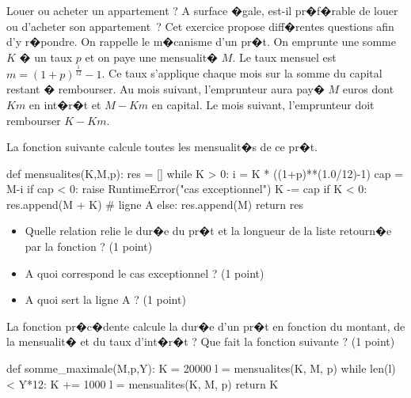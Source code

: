 %

\firstpassagedo{
\newcommand{\sametextforthisinterro}[0]{ 
\huge Formation pour l'Actuaire Data Scientist, TD not�
\normalsize
}

\sametextforthisinterro
}


\exosubject{}
\begin{xexercice}\label{td_note_label1__2016}%


Louer ou acheter un appartement ? A surface �gale, est-il pr�f�rable de louer ou d'acheter son appartement~? Cet exercice propose diff�rentes questions afin d'y r�pondre. On rappelle le m�canisme d'un pr�t. On emprunte une somme $K$ � un taux $p$ et on paye une mensualit� $M$. Le taux mensuel est $m=(1+p)^\frac{1}{12}-1$. 
Ce taux s'applique chaque mois sur la somme du capital restant � rembourser. Au mois suivant, l'emprunteur aura pay� $M$ euros dont $Km$ en int�r�t et $M-Km$ en capital. Le mois suivant, l'emprunteur doit rembourser $K-Km$.

\exequest La fonction suivante calcule toutes les mensualit�s de ce pr�t.

\begin{verbatimx}
def mensualites(K,M,p):
    res = []
    while K > 0:
        i = K * ((1+p)**(1.0/12)-1)
        cap = M-i
        if cap < 0:
            raise RuntimeError("cas exceptionnel")
        K -= cap
        if K < 0:
            res.append(M + K)  #  ligne A
        else:
            res.append(M)
    return res
\end{verbatimx}

\begin{itemize}
\item Quelle relation relie le dur�e du pr�t et la longueur de la liste retourn�e par la fonction ? (1 point)
\item A quoi correspond le cas exceptionnel ? (1 point)
\item A quoi sert la ligne A ? (1 point)
\end{itemize}

\exequest La fonction pr�c�dente calcule la dur�e d'un pr�t en fonction du montant, de la mensualit� et du taux d'int�r�t ? Que fait la fonction suivante ? (1 point)

\begin{verbatimx}
def somme_maximale(M,p,Y):
    K = 20000
    l = mensualites(K, M, p)
    while len(l) < Y*12:
        K += 1000
        l = mensualites(K, M, p)
    return K
\end{verbatimx}
		


\end{xexercice}
